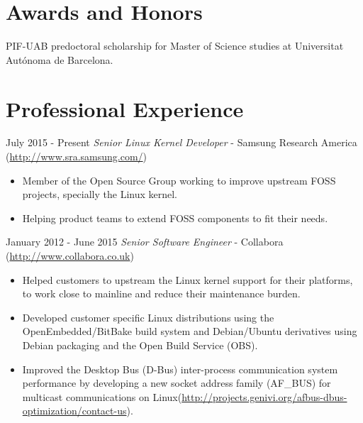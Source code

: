 \documentclass{simplecv}
\begin{document}
\section{Awards and Honors}

PIF-UAB predoctoral scholarship for Master of Science studies at Universitat Autónoma de Barcelona.

\section{Professional Experience}

\begin{topic}

\item[July 2015 - Present] \emph{Senior Linux Kernel Developer} - Samsung Research America (\url{http://www.sra.samsung.com/})

\begin{itemize}

\item Member of the Open Source Group working to improve upstream FOSS projects, specially the Linux kernel.

\item Helping product teams to extend FOSS components to fit their needs.

\end{itemize}

\item[January 2012 - June 2015] \emph{Senior Software Engineer} - Collabora (\url{http://www.collabora.co.uk})

\begin{itemize}

\item Helped customers to upstream the Linux kernel support for their platforms, to work close to mainline and reduce their maintenance burden.

\item Developed customer specific Linux distributions using the OpenEmbedded/BitBake build system and Debian/Ubuntu derivatives using Debian packaging and the Open Build Service (OBS).

\item Improved the Desktop Bus (D-Bus) inter-process communication system performance by developing a new socket address family (AF\_BUS) for multicast communications on Linux(\url{http://projects.genivi.org/afbus-dbus-optimization/contact-us}).

\end{itemize}


\end{topic}
\end{document}
